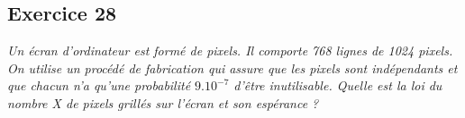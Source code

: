 \subsection*{Exercice 28}
\textit{Un écran d’ordinateur est formé de pixels. Il comporte 768 lignes de 1024 pixels.
On utilise un procédé de fabrication qui assure que les pixels sont indépendants et que chacun n’a qu’une probabilité $9.10^{-7}$ d’être inutilisable. Quelle est la loi du nombre X de pixels grillés sur l’écran et son espérance ?}